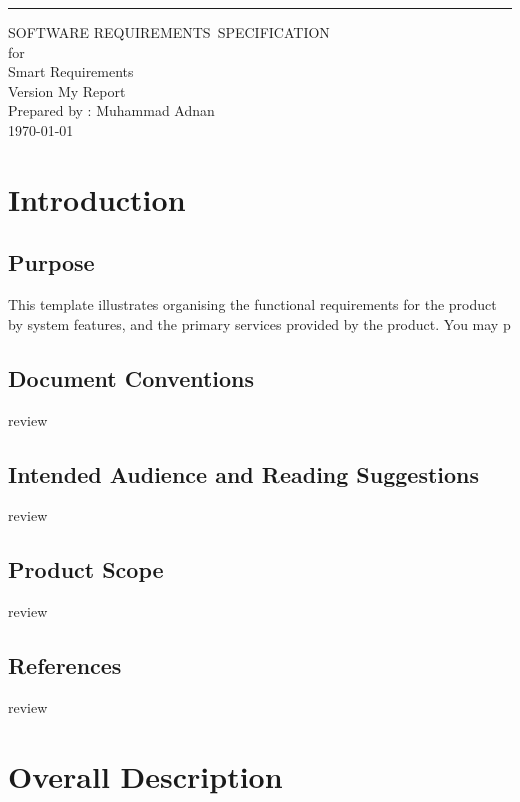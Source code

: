 \documentclass{scrreprt}
\date{}
\def\myversion{My Report}
\begin{document}
    
    \begin{flushright}
        \rule{16cm}{5pt}\vskip1cm
        \begin{bfseries}
            \Huge{SOFTWARE REQUIREMENTS\ SPECIFICATION}\
            \vspace{1.5cm} 
            \\for\\
            \vspace{1.5cm}
            Smart Requirements\\
            \vspace{1.5cm}
            \LARGE{Version \myversion}\\
            \vspace{1.5cm}
            Prepared by : Muhammad Adnan\\ 
            \vspace{1.5cm}
            \today\
        \end{bfseries}
    \end{flushright}
    
    
    \tableofcontents
    
    \chapter{Introduction} 
    \section{Purpose}
    This template illustrates organising the functional requirements for the product by system features, and the primary services provided by the product. You may p
    \section{Document Conventions} 
    review
    \section{Intended Audience and Reading Suggestions}
    review
    \section{Product Scope}
    review
    \section{References} 
    review
    
    \chapter{Overall Description} 
\end{document}
